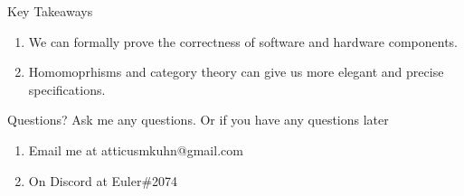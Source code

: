\documentclass[aspectratio=169]{beamer}
\begin{document}
\begin{frame}{Key Takeaways}
  \begin{enumerate}
    \pause \item We can formally prove the correctness of software and hardware components.
    \pause \item Homomoprhisms and category theory can give us more elegant and precise specifications.
\end{enumerate}
\end{frame}
\begin{frame}{Questions?}
  Ask me any questions.
  Or if you have any questions later
  \begin{enumerate}
    \item Email me at atticusmkuhn@gmail.com
     \item On Discord at Euler\#2074
\end{enumerate}
\end{frame}
\end{document}
